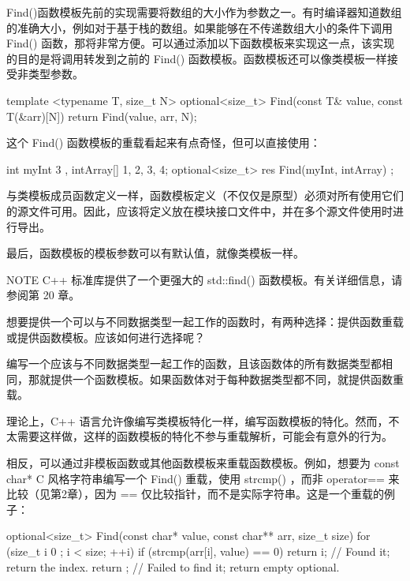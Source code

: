 Find()函数模板先前的实现需要将数组的大小作为参数之一。有时编译器知道数组的准确大小，例如对于基于栈的数组。如果能够在不传递数组大小的条件下调用 Find() 函数，那将非常方便。可以通过添加以下函数模板来实现这一点，该实现的目的是将调用转发到之前的 Find() 函数模板。函数模板还可以像类模板一样接受非类型参数。

\begin{cpp}
template <typename T, size_t N>
optional<size_t> Find(const T& value, const T(&arr)[N])
{
    return Find(value, arr, N);
}
\end{cpp}

这个 Find() 函数模板的重载看起来有点奇怪，但可以直接使用：

\begin{cpp}
int myInt { 3 }, intArray[] {1, 2, 3, 4};
optional<size_t> res { Find(myInt, intArray) };
\end{cpp}

与类模板成员函数定义一样，函数模板定义（不仅仅是原型）必须对所有使用它们的源文件可用。因此，应该将定义放在模块接口文件中，并在多个源文件使用时进行导出。

最后，函数模板的模板参数可以有默认值，就像类模板一样。

\begin{myNotic}{NOTE}
C++ 标准库提供了一个更强大的 std::find() 函数模板。有关详细信息，请参阅第 20 章。
\end{myNotic}


想要提供一个可以与不同数据类型一起工作的函数时，有两种选择：提供函数重载或提供函数模板。应该如何进行选择呢？

编写一个应该与不同数据类型一起工作的函数，且该函数体的所有数据类型都相同，那就提供一个函数模板。如果函数体对于每种数据类型都不同，就提供函数重载。


理论上，C++ 语言允许像编写类模板特化一样，编写函数模板的特化。然而，不太需要这样做，这样的函数模板的特化不参与重载解析，可能会有意外的行为。

相反，可以通过非模板函数或其他函数模板来重载函数模板。例如，想要为 const char* C 风格字符串编写一个 Find() 重载，使用 strcmp() ，而非 operator== 来比较（见第2章），因为 == 仅比较指针，而不是实际字符串。这是一个重载的例子：

\begin{cpp}
optional<size_t> Find(const char* value, const char** arr, size_t size)
{
    for (size_t i { 0 }; i < size; ++i) {
        if (strcmp(arr[i], value) == 0) {
            return i; // Found it; return the index.
        }
    }
    return {}; // Failed to find it; return empty optional.
}
\end{cpp}

